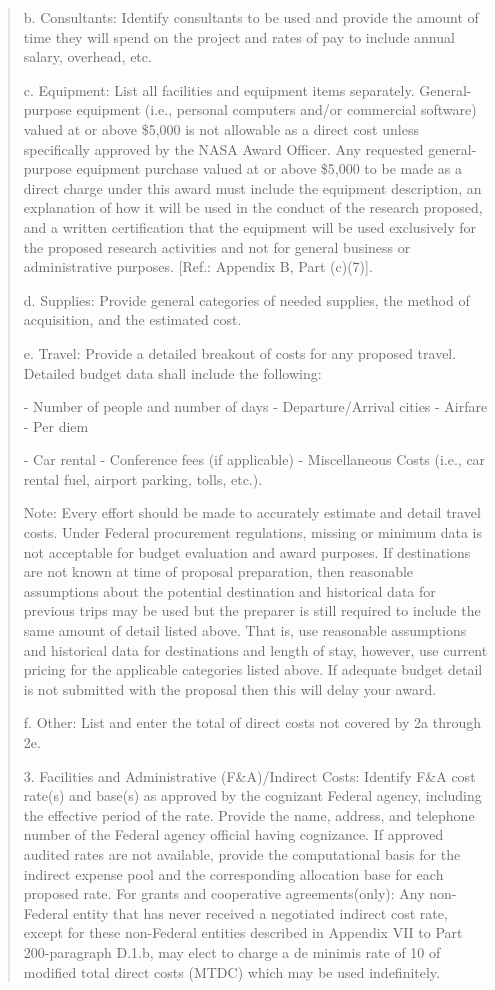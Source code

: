 \documentclass[12pt]{article}
\begin{document}
\begin{quote}
b. Consultants: Identify consultants to be used and provide the amount
of time they will spend on the project and rates of pay to include
annual salary, overhead, etc.

c. Equipment: List all facilities and equipment items
separately. General-purpose equipment (i.e., personal computers and/or
commercial software) valued at or above \$5,000 is not allowable as a
direct cost unless specifically approved by the NASA Award
Officer. Any requested general-purpose equipment purchase valued at or
above \$5,000 to be made as a direct charge under this award must
include the equipment description, an explanation of how it will be
used in the conduct of the research proposed, and a written
certification that the equipment will be used exclusively for the
proposed research activities and not for general business or
administrative purposes. [Ref.: Appendix B, Part (c)(7)].

d. Supplies: Provide general categories of needed supplies, the method
of acquisition, and the estimated cost.

e. Travel: Provide a detailed breakout of costs for any proposed
travel. Detailed budget data shall include the following:

- Number of people and number of days - Departure/Arrival cities -
  Airfare - Per diem

- Car rental - Conference fees (if applicable) - Miscellaneous Costs
  (i.e., car rental fuel, airport parking, tolls, etc.).

Note: Every effort should be made to accurately estimate and detail
travel costs. Under Federal procurement regulations, missing or
minimum data is not acceptable for budget evaluation and award
purposes. If destinations are not known at time of proposal
preparation, then reasonable assumptions about the potential
destination and historical data for previous trips may be used but the
preparer is still required to include the same amount of detail listed
above. That is, use reasonable assumptions and historical data for
destinations and length of stay, however, use current pricing for the
applicable categories listed above. If adequate budget detail is not
submitted with the proposal then this will delay your award.

f. Other: List and enter the total of direct costs not covered by 2a
through 2e.



3. Facilities and Administrative (F\&A)/Indirect Costs: Identify F\&A
   cost rate(s) and base(s) as approved by the cognizant Federal
   agency, including the effective period of the rate. Provide the
   name, address, and telephone number of the Federal agency official
   having cognizance. If approved audited rates are not available,
   provide the computational basis for the indirect expense pool and
   the corresponding allocation base for each proposed rate. For
   grants and cooperative agreements(only): Any non-Federal entity
   that has never received a negotiated indirect cost rate, except for
   these non-Federal entities described in Appendix VII to Part
   200-paragraph D.1.b, may elect to charge a de minimis rate of 10%
   of modified total direct costs (MTDC) which may be used
   indefinitely.


\end{quote}
\end{document}
